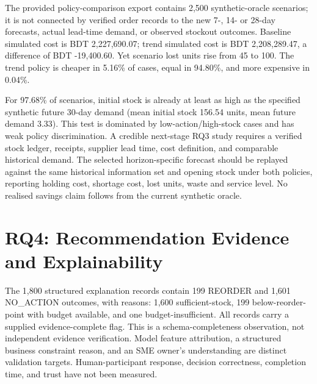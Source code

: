 The provided policy-comparison export contains 2,500 synthetic-oracle scenarios; it is not connected by verified order records to the new 7-, 14- or 28-day forecasts, actual lead-time demand, or observed stockout outcomes. Baseline simulated cost is BDT 2,227,690.07; trend simulated cost is BDT 2,208,289.47, a difference of BDT -19,400.60. Yet scenario lost units rise from 45 to 100. The trend policy is cheaper in 5.16\% of cases, equal in 94.80\%, and more expensive in 0.04\%.

For 97.68\% of scenarios, initial stock is already at least as high as the specified synthetic future 30-day demand (mean initial stock 156.54 units, mean future demand 3.33). This test is dominated by low-action/high-stock cases and has weak policy discrimination. A credible next-stage RQ3 study requires a verified stock ledger, receipts, supplier lead time, cost definition, and comparable historical demand. The selected horizon-specific forecast should be replayed against the same historical information set and opening stock under both policies, reporting holding cost, shortage cost, lost units, waste and service level. No realised savings claim follows from the current synthetic oracle.

\section{RQ4: Recommendation Evidence and Explainability}

The 1,800 structured explanation records contain 199 REORDER and 1,601 NO\_ACTION outcomes, with reasons: 1,600 sufficient-stock, 199 below-reorder-point with budget available, and one budget-insufficient. All records carry a supplied evidence-complete flag. This is a schema-completeness observation, not independent evidence verification. Model feature attribution, a structured business constraint reason, and an SME owner's understanding are distinct validation targets. Human-participant response, decision correctness, completion time, and trust have not been measured.

